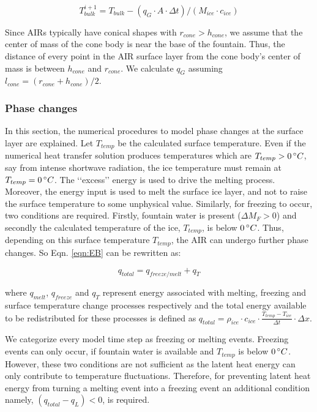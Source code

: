 \documentclass[utf8]{frontiersSCNS}
\begin{document}
\begin{equation} T_{bulk}^{i+1} = T_{bulk} - (q_{G} \cdot A \cdot \Delta t)/(M_{ice} \cdot c_{ice}) \end{equation}

Since AIRs typically have conical shapes with $r_{cone} > h_{cone}$, we assume that the center of mass of the cone
body is near the base of the fountain. Thus, the distance of every point in the AIR surface layer from the cone
body's center of mass is between $h_{cone}$ and $r_{cone}$. We calculate $q_{G}$ assuming $l_{cone} = (r_{cone} +
	h_{cone})/2$.

\subsubsection{Phase changes}

In this section, the numerical procedures to model phase changes at the surface layer are explained. Let
$T_{temp}$ be the calculated surface temperature. Even if the numerical heat transfer solution produces
temperatures which are $T_{temp}>0\, \degree C$, say from intense shortwave radiation, the ice temperature must
remain at $T_{temp} = 0\, \degree C$. The ‘‘excess’’ energy is used to drive the melting process. Moreover, the
energy input is used to melt the surface ice layer, and not to raise the surface temperature to some unphysical
value. Similarly, for freezing to occur, two conditions are required. Firstly, fountain water is present
($\Delta M_{F} > 0 $) and secondly the calculated temperature of the ice, $T_{temp}$, is below $0\, \degree C$.
Thus, depending on this surface temperature $T_{temp}$, the AIR can undergo further phase changes. So Eqn.
\ref{eqn:EB} can be rewritten as:

\begin{equation}
	q_{total}= q_{freeze/melt} + q_{T}
\end{equation}

where $q_{melt}$, $q_{freeze}$ and $q_{T}$ represent energy associated with melting, freezing and surface
temperature change processes respectively and the total energy available to be redistributed for these processes
is defined as $q_{total}=\rho_{ice} \cdot c_{ice} \cdot \frac{T_{temp}-T_{ice}}{\Delta t} \cdot \Delta x$.

We categorize every model time step as freezing or melting events. Freezing events can only occur, if fountain
water is available and $T_{temp}$ is below $0\,\degree C$. However, these two conditions are not sufficient as
the latent heat energy can only contribute to temperature fluctuations. Therefore, for preventing latent heat
energy from turning a melting event into a freezing event an additional condition namely, $(q_{total}-q_{L}) <
0$, is required.
\end{document}

